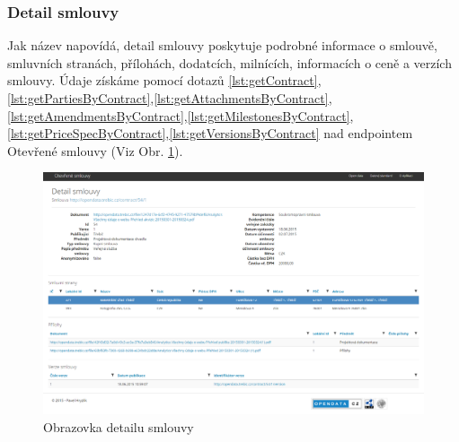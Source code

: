 






\subsubsection*{Detail smlouvy}

Jak název napovídá, detail smlouvy poskytuje podrobné informace o smlouvě, smluvních stranách, přílohách, dodatcích, milnících, informacích o ceně a verzích smlouvy. Údaje získáme pomocí dotazů \ref{lst:getContract},\ref{lst:getPartiesByContract},\ref{lst:getAttachmentsByContract},\ref{lst:getAmendmentsByContract},\ref{lst:getMilestonesByContract},\ref{lst:getPriceSpecByContract},\ref{lst:getVersionsByContract} nad endpointem Otevřené smlouvy (Viz Obr. \ref{obr:contractDetail}).\\

\begin{figure}[H]
\centerline{\includegraphics[width=\textwidth]{img/webContractDetail.eps}}
\caption{Obrazovka detailu smlouvy}
\label{obr:contractDetail}
\end{figure}



